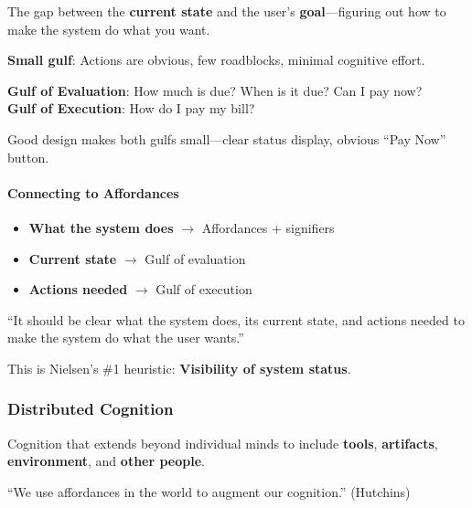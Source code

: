 \begin{defbox}
The gap between the \textbf{current state} and the user's \textbf{goal}---figuring out how to make the system do what you want.

\textbf{Small gulf}: Actions are obvious, few roadblocks, minimal cognitive effort.
\end{defbox}

\begin{exbox}
\textbf{Gulf of Evaluation}: How much is due? When is it due? Can I pay now?\\
\textbf{Gulf of Execution}: How do I pay my bill?

Good design makes both gulfs small---clear status display, obvious ``Pay Now'' button.
\end{exbox}

\paragraph*{Connecting to Affordances}
\begin{itemize}
  \item \textbf{What the system does} $\to$ Affordances + signifiers
  \item \textbf{Current state} $\to$ Gulf of evaluation
  \item \textbf{Actions needed} $\to$ Gulf of execution
\end{itemize}

\begin{keybox}
``It should be clear what the system does, its current state, and actions needed to make the system do what the user wants.''

This is Nielsen's \#1 heuristic: \textbf{Visibility of system status}.
\end{keybox}

\subsubsection*{Distributed Cognition}

\begin{defbox}
Cognition that extends beyond individual minds to include \textbf{tools}, \textbf{artifacts}, \textbf{environment}, and \textbf{other people}.

``We use affordances in the world to augment our cognition.'' (Hutchins)
\end{defbox}


